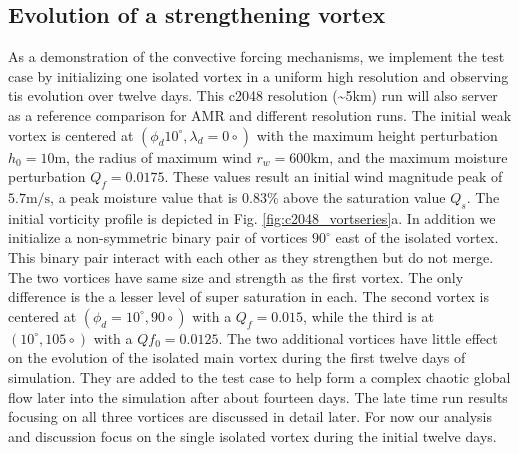    \subsection{Evolution of a strengthening vortex}
   As a demonstration of the convective forcing mechanisms, we implement the test 
   case by initializing one isolated vortex in a uniform high resolution and observing
   tis evolution over twelve days.
   This c2048 resolution (\textasciitilde 5km) run will also server as a reference comparison 
   for AMR and different resolution runs. The initial weak vortex is centered at
   $(\phi_d 10^\circ ,  \lambda_d = 0\circ)$ with the maximum height perturbation $h_0=10 \mathrm{ m}$,
   the radius of maximum wind $r_w= 600 \mathrm{ km}$, and the maximum moisture perturbation
   $Q_f=0.0175$. These values result an initial wind magnitude peak of $ 5.7 \mathrm{ m/s}$, 
   a peak moisture value that is 0.83\% above the saturation value $Q_s$. The initial vorticity 
   profile is depicted in Fig. \ref{fig:c2048_vortseries}a. In addition we initialize 
   a non-symmetric binary pair of vortices $90^\circ$ east of the isolated vortex. This binary pair 
   interact with each other as they strengthen but do not merge. The two vortices have same size 
   and strength as the first vortex. The only difference is the a lesser level of super saturation 
   in each. The second vortex is centered at
   $(\phi_d =10^\circ , 90\circ)$ with a $Q_f=0.015$, while the third 
   is at $(10^\circ , 105\circ)$ with a $Qf_0=0.0125$.
   The two additional vortices have little effect on the 
   evolution of the isolated main vortex during the first twelve days of simulation. They are added
   to the test case to help form a complex chaotic global flow later into the simulation after about 
   fourteen days. The late time run results focusing on all three vortices are discussed in detail
   later. For now our analysis and discussion focus on the single 
   isolated vortex during the initial twelve days.
   
